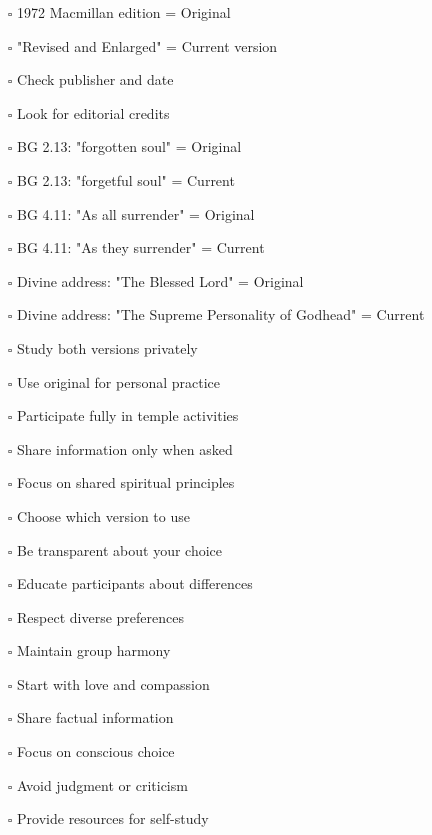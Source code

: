 \documentclass[12pt,twoside]{book}
\begin{document}
\begin{itemize}
\item[{$\square$}] 1972 Macmillan edition = Original
\item[{$\square$}] "Revised and Enlarged" = Current version
\item[{$\square$}] Check publisher and date
\item[{$\square$}] Look for editorial credits

\item[{$\square$}] BG 2.13: "forgotten soul" = Original
\item[{$\square$}] BG 2.13: "forgetful soul" = Current
\item[{$\square$}] BG 4.11: "As all surrender" = Original
\item[{$\square$}] BG 4.11: "As they surrender" = Current
\item[{$\square$}] Divine address: "The Blessed Lord" = Original
\item[{$\square$}] Divine address: "The Supreme Personality of Godhead" = Current

\item[{$\square$}] Study both versions privately
\item[{$\square$}] Use original for personal practice
\item[{$\square$}] Participate fully in temple activities
\item[{$\square$}] Share information only when asked
\item[{$\square$}] Focus on shared spiritual principles

\item[{$\square$}] Choose which version to use
\item[{$\square$}] Be transparent about your choice
\item[{$\square$}] Educate participants about differences
\item[{$\square$}] Respect diverse preferences
\item[{$\square$}] Maintain group harmony

\item[{$\square$}] Start with love and compassion
\item[{$\square$}] Share factual information
\item[{$\square$}] Focus on conscious choice
\item[{$\square$}] Avoid judgment or criticism
\item[{$\square$}] Provide resources for self-study
\end{itemize}
\end{document}
